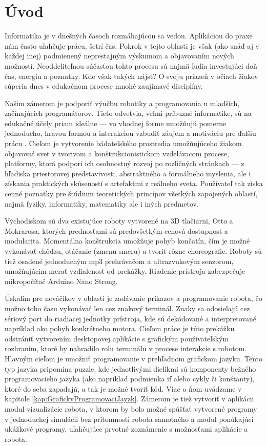 
\chapter*{Úvod} %

Informatika je v dnešných časoch rozmáhajúcou sa vedou. Aplikáciou do praxe nám často uľahčuje prácu, šetrí čas. Pokrok v tejto oblasti je však (ako snáď aj v každej inej) podmienený neprestajným výskumom a objavovaním nových možností. Neoddeliteľnou súčasťou tohto procesu sú najmä ľudia investujúci doň čas, energiu a poznatky. Kde však takých nájsť? O svoju priazeň v očiach žiakov súperia dnes v edukačnom procese mnohé zaujímavé disciplíny.

Našim zámerom je podporiť výučbu robotiky a programovania u mladších, začínajúcich programátorov. Tieto odvetvia, veľmi príbuzné informatike, sú na edukačné účely priam ideálne --- vo vhodnej forme umožňujú pomerne jednoducho, hravou formou a interakciou vzbudiť záujem a motiváciu pre ďalšiu prácu \cite{parker2019learning}. Cieľom je vytvorenie bádateľského prostredia umožňujúceho žiakom objavovať svet v tvorivom a konštrukcionistickom vzdelávacom procese, platformy, ktorá podporí ich osobnostný rozvoj po rozličných stránkach --- z hľadiska priestorovej predstavivosti, abstraktného a formálneho myslenia, ale i získania praktických skúseností s artefaktmi z reálneho sveta. Používateľ tak získa cenné poznatky pre štúdium teoretických princípov všetkých zapojených oblastí, najmä fyziky, informatiky, matematiky ale i iných predmetov.

Východiskom sú dva existujúce roboty vytvorené na 3D tlačiarni, Otto a Mokrarosa, ktorých prednosťami sú predovšetkým cenová dostupnosť a modularita. Momentálna konštrukcia umožňuje pohyb končatín, čím je možné vykonávať chôdzu, otáčanie (zmenu smeru) a tvoriť rôzne choreografie. Roboty sú tiež osadené jednoduchým mp3 prehrávačom a ultrazvukovým senzorom, umožňujúcim merať vzdialenosť od prekážky. Riadenie prístroja zabezpečuje mikropočítač Arduino Nano Strong.

Úskalím pre nováčikov v oblasti je zadávanie príkazov a programovanie robota, čo možno toho času vykonávať len cez znakový terminál. Znaky sa odosielajú cez sériový port do riadiacej jednotky prístroja, kde sú dekódované a interpretované napríklad ako pohyb konkrétneho motora. Cieľom práce je túto prekážku odstrániť vytvorením desktopovej aplikácie s grafickým používateľským rozhraním, ktoré by nahradilo rolu terminálu v procese interakcie s robotom. Hlavným cieľom je umožniť programovanie v prehľadnom grafickom jazyku. Tento typ jazyka pripomína puzzle, kde jednotlivými dielikmi sú komponenty bežného programovacieho jazyka (ako napríklad podmienka if alebo cykly či konštanty), ktoré do seba zapadajú, a tak je možné tvoriť kód. Viac o ňom uvádzame v kapitole \ref{kap:GrafickyProgramovaciJayzk}.
Zámerom je tiež vytvoriť v aplikácii modul vizualizácie robota, v ktorom by bolo možné spúšťať vytvorené programy v jednoduchej simulácii bez prítomnosti robota samotného a modul ponúkajúci ukážkové programy, uľahčujúce prvotné zoznámenie s možnosťami aplikácie a robota.
